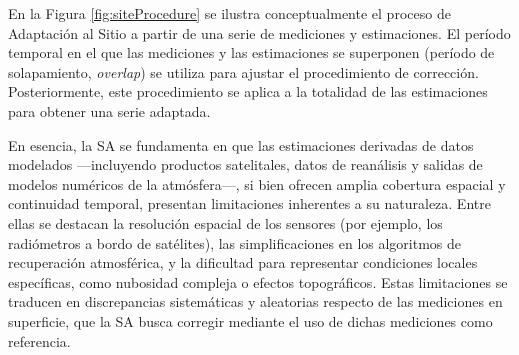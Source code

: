 En la Figura \ref{fig:siteProcedure} se ilustra conceptualmente el proceso de Adaptación al Sitio a partir de una serie de mediciones y estimaciones. El período temporal en el que las mediciones y las estimaciones se superponen (período de solapamiento, \textit{overlap}) se utiliza para ajustar el procedimiento de corrección. Posteriormente, este procedimiento se aplica a la totalidad de las estimaciones para obtener una serie adaptada.

En esencia, la SA se fundamenta en que las estimaciones derivadas de datos modelados —incluyendo productos satelitales, datos de reanálisis y salidas de modelos numéricos de la atmósfera—, si bien ofrecen amplia cobertura espacial y continuidad temporal, presentan limitaciones inherentes a su naturaleza. Entre ellas se destacan la resolución espacial de los sensores (por ejemplo, los radiómetros a bordo de satélites), las simplificaciones en los algoritmos de recuperación atmosférica, y la dificultad para representar condiciones locales específicas, como nubosidad compleja o efectos topográficos. Estas limitaciones se traducen en discrepancias sistemáticas y aleatorias respecto de las mediciones en superficie, que la SA busca corregir mediante el uso de dichas mediciones como referencia.



